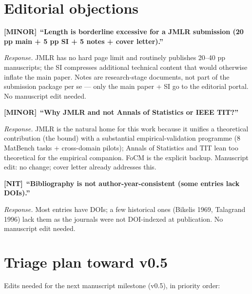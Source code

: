 \documentclass[11pt,a4paper]{article}
\theoremstyle{plain}
\newcommand{\Minor}{\textcolor{minorobj}{\textbf{[MINOR]}}\ }
\newcommand{\Nit}{\textcolor{nitobj}{\textbf{[NIT]}}\ }
\begin{document}
\section{Editorial objections}

\Minor \textbf{``Length is borderline excessive for a JMLR submission
(20 pp main + 5 pp SI + 5 notes + cover letter).''}

\emph{Response.}  JMLR has no hard page limit and routinely publishes
20--40 pp manuscripts; the SI compresses additional technical content
that would otherwise inflate the main paper.  Notes are research-stage
documents, not part of the submission package per se --- only the
main paper + SI go to the editorial portal.  No manuscript edit
needed.

\smallskip
\Minor \textbf{``Why JMLR and not Annals of Statistics or IEEE TIT?''}

\emph{Response.}  JMLR is the natural home for this work because it
unifies a theoretical contribution (the bound) with a substantial
empirical-validation programme (8 MatBench tasks + cross-domain
pilots); Annals of Statistics and TIT lean too theoretical for the
empirical companion.  FoCM is the explicit backup.  Manuscript edit:
no change; cover letter already addresses this.

\smallskip
\Nit \textbf{``Bibliography is not author-year-consistent (some
entries lack DOIs).''}

\emph{Response.}  Most entries have DOIs; a few historical ones
(Bikelis 1969, Talagrand 1996) lack them as the journals were not
DOI-indexed at publication.  No manuscript edit needed.

\section{Triage plan toward v0.5}

Edits needed for the next manuscript milestone (v0.5), in priority
order:
\end{document}
